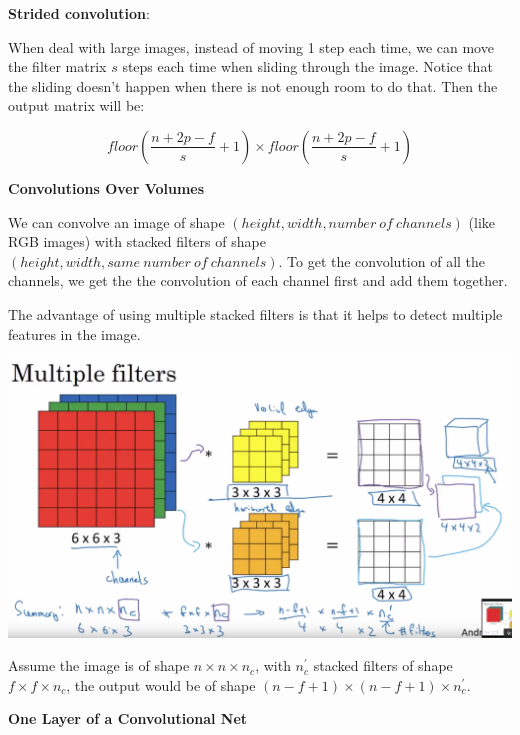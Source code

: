 \documentclass{article}
\begin{document}
\noindent \textbf{Strided convolution}:

\noindent When deal with large images, instead of moving 1 step each time, we can move the filter matrix \(s\) steps each time when sliding through the image. Notice that the sliding doesn't happen when there is not enough room to do that. Then the output matrix will be:

\[floor(\frac{n + 2p - f}{s}  + 1) \times floor(\frac{n + 2p - f}{s} + 1)\]

\noindent \textbf{Convolutions Over Volumes}

\noindent We can convolve an image of shape \((height, width, number \ of \ channels)\) (like RGB images) with stacked filters of shape \((height, width, same \ number \ of \ channels)\). To get the convolution of all the channels, we get the the convolution of each channel first and add them together.

\bigskip

\noindent The advantage of using multiple stacked filters is that it helps to detect multiple features in the image.

\begin{center}
\includegraphics[scale=0.2]{./images/convolutions_over_volumes.png}
\end{center}

\noindent Assume the image is of shape \(n \times n \times n_{c}\), with \(n_{c}^{'}\) stacked filters of shape \(f \times f \times n_{c}\), the output would be of shape \((n - f + 1) \times (n - f + 1) \times n_{c}^{'}\).

\bigskip

\noindent \textbf{One Layer of a Convolutional Net}
\end{document}
